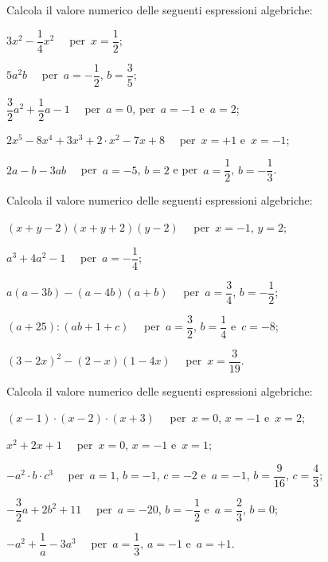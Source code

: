 \begin{esercizio}
\label{ese:9.17} %
Calcola il valore numerico delle seguenti espressioni algebriche:
 \begin{enumeratea}
\spazielenx
 \item $3x^{2}-\dfrac{1}{4}x^{2}\quad$ per~$x=\dfrac{1}{2}$;
 \item $5a^{2}b\quad$ per~$a=-{\dfrac{1}{2}}$, $b=\dfrac{3}{5}$;
 \item $\dfrac{3}{2} a^{2}+\dfrac{1}{2}a-1\quad$ per~$a=0$, per~$a=-1$ e~$a=2$;
 \item $2 x^{5}-8 x^{4}+3 x^{3}+2\cdot x^{2}-7 x+8\quad$ per~$x=+1$ e~$x=-1$;
 \item $2a-b-3 ab\quad$ per~$a=-5$, $b=2$ e per~$a=\dfrac{1}{2}$, $b=-\dfrac{1}{3}$.
 \end{enumeratea}
\end{esercizio}

\begin{esercizio}[\Ast]
\label{ese:9.18} %
Calcola il valore numerico delle seguenti espressioni algebriche:
 \begin{enumeratea}
\spazielenx
 \item $(x+y-2)(x+y+2)(y-2)\quad$ per~$x=-1$, $y=2$;
 \item $a^{3}+4a^2-1\quad$ per~$a=-{\dfrac{1}{4}}$;
 \item $a(a-3b)-(a-4b)(a+b)\quad$ per~$a=\dfrac{3}{4}$, $b=-\dfrac{1}{2}$;
 \item $(a+25):(ab+1+c)\quad$ per~$a=\dfrac{3}{2}$, $b=\dfrac{1}{4}$ e~$c=-8$;
 \item $(3-2x)^2-(2-x)(1-4x)\quad$ per~$x=\dfrac{3}{19}$.
 \end{enumeratea}
\end{esercizio}

\begin{esercizio}
\label{ese:9.19} %
Calcola il valore numerico delle seguenti espressioni algebriche:
 \begin{enumeratea}
\spazielenx
 \item $(x-1)\cdot (x-2)\cdot (x+3)\quad$ per~$x=0$, $x= -1$ e~$x= 2$;
 \item $x^{2}+2x+1\quad$ per~$x=0$, $x= -1$ e~$x= 1$;
 \item $-a^{2}\cdot b\cdot c^{3}\quad$ per~$a=1$, $b=-1$, $c=-2$ e~$a=-1$, $b=\dfrac{9}{16}$, $c=\dfrac{4}{3}$;
 \item $-{\dfrac{3}{2}}a+2b^{2}+11\quad$ per~$a=-20$, $b=-{\dfrac{1}{2}}$ e~$a=\dfrac{2}{3}$, $b=0$;
 \item $-a^{2}+\dfrac{1}{a}-3 a^{3}\quad$ per~$a=\dfrac{1}{3}$, $a=-1$ e~$a=+1$.
 \end{enumeratea}
\end{esercizio}

